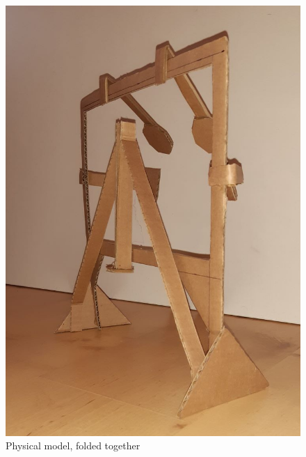 \documentclass[a4paper]{jpconf}
\begin{document}
\begin{figure}[H]
	\centering
	\includegraphics[width=1\linewidth]{pappi_3.jpg}
	\caption{Physical model, folded together}
	\label{fig:pappi_3}
\end{figure}
	
	
	
	
	
	
	

	
\end{document}
